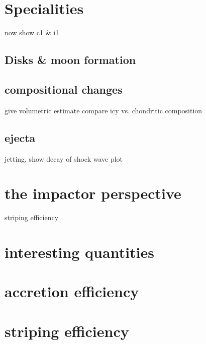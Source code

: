 \section{Specialities}
now show c1 \& i1
\subsection{Disks \& moon formation}

\subsection{compositional changes}
give volumetric estimate
compare icy vs. chondritic composition

\subsection{ejecta}
jetting, show decay of shock wave plot

\section{the impactor perspective}
striping efficiency


\section{interesting quantities}
\section{accretion efficiency}
\section{striping efficiency}

\cite{Chambers:2001p2105}
\citep{chandrasekhar1969ellipsoidal}
\cite{Lissauer:1993p56}
\cite{Wetherill:1993p3351}






